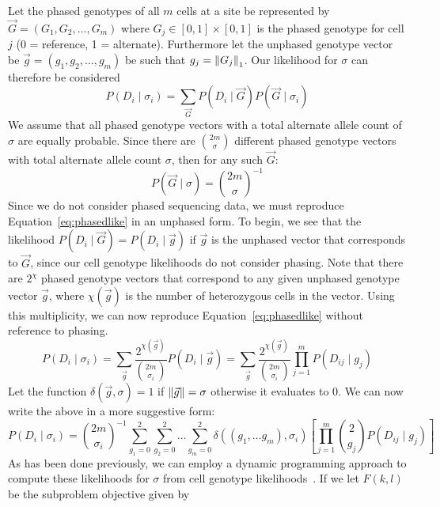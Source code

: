 \documentclass[../main.tex]{subfiles}
\begin{document}
Let the phased genotypes of all $m$ cells at a site be represented by $\vec{G} = (G_1,G_2,\dots,G_m)$ where $G_j\in [0,1]\times[0,1]$ is the phased genotype for cell $j$ (0 = reference, 1 = alternate). Furthermore let the unphased genotype vector be $\vec{g} = (g_1,g_2,\dots,g_m)$ be such that $g_j = \left\lVert G_j\right\rVert_1$. Our likelihood for $\sigma$ can therefore be considered
\begin{equation} \label{eq:phasedlike}
P(D_i\mid\sigma_i) = \sum_{\vec{G}} P(D_i \mid \vec{G}) P(\vec{G} \mid \sigma_i)
\end{equation}
We assume that all phased genotype vectors with a total alternate allele count of $\sigma$ are equally probable. Since there are $\binom{2m}{\sigma}$ different phased genotype vectors with total alternate allele count $\sigma$, then for any such $\vec{G}$:
\begin{equation*}
P(\vec{G}\mid \sigma) = \binom{2m}{\sigma}^{-1}
\end{equation*}
Since we do not consider phased sequencing data, we must reproduce Equation~\eqref{eq:phasedlike} in an unphased form. To begin, we see that the likelihood $P(D_i\mid \vec{G}) = P(D_i\mid \vec{g})$ if $\vec{g}$ is the unphased vector that corresponds to $\vec{G}$, since our cell genotype likelihoods do not consider phasing. Note that there are $2^\chi$ phased genotype vectors that correspond to any given unphased genotype vector $\vec{g}$, where $\chi(\vec{g})$ is the number of heterozygous cells in the vector. Using this multiplicity, we can now reproduce Equation~\eqref{eq:phasedlike} without reference to phasing.
\begin{equation*}
P(D_i\mid\sigma_i) = \sum_{\vec{g}} \frac{2^{\chi(\vec{g})}}{\binom{2m}{\sigma_i}} P(D_i\mid\vec{g}) = \sum_{\vec{g}} \frac{2^{\chi(\vec{g})}}{\binom{2m}{\sigma_i}} \prod_{j=1}^{m}P(D_{ij}\mid g_{j})
\end{equation*}
Let the function $\delta(\vec{g},\sigma) = 1$ if $\left\lVert\vec{g}\right\rVert=\sigma$ otherwise it evaluates to 0. We can now write the above in a more suggestive form:
\begin{equation}\label{eq:sitelikelihood}
P(D_i\mid\sigma_i) = \binom{2m}{\sigma_i}^{-1}\sum_{g_1=0}^2\sum_{g_2=0}^2\dots\sum_{g_m=0}^2 \delta((g_1,\dots g_m),\sigma_i)\left[\prod_{j=1}^{m}\binom{2}{g_j}P(D_{ij}\mid g_{j})\right]
\end{equation}
As has been done previously, we can employ a dynamic programming approach to compute these likelihoods for $\sigma$ from cell genotype likelihoods~\cite{monovar, sciphi, ledurbin}. If we let $F(k,l)$ be the subproblem objective given by
\end{document}
